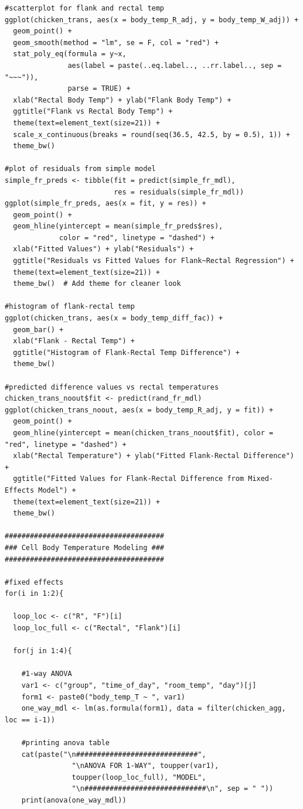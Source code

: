 \documentclass[a4paper, 10pt, titlepage]{article}
\begin{document}
\begin{lstlisting}[basicstyle = \footnotesize \ttfamily]
#scatterplot for flank and rectal temp
ggplot(chicken_trans, aes(x = body_temp_R_adj, y = body_temp_W_adj)) +
  geom_point() +
  geom_smooth(method = "lm", se = F, col = "red") +
  stat_poly_eq(formula = y~x, 
               aes(label = paste(..eq.label.., ..rr.label.., sep = "~~~")), 
               parse = TRUE) +
  xlab("Rectal Body Temp") + ylab("Flank Body Temp") +
  ggtitle("Flank vs Rectal Body Temp") +
  theme(text=element_text(size=21)) +
  scale_x_continuous(breaks = round(seq(36.5, 42.5, by = 0.5), 1)) +
  theme_bw()

#plot of residuals from simple model
simple_fr_preds <- tibble(fit = predict(simple_fr_mdl),
                          res = residuals(simple_fr_mdl))
ggplot(simple_fr_preds, aes(x = fit, y = res)) +
  geom_point() +
  geom_hline(yintercept = mean(simple_fr_preds$res),
             color = "red", linetype = "dashed") +
  xlab("Fitted Values") + ylab("Residuals") +
  ggtitle("Residuals vs Fitted Values for Flank~Rectal Regression") +
  theme(text=element_text(size=21)) +
  theme_bw()  # Add theme for cleaner look

#histogram of flank-rectal temp
ggplot(chicken_trans, aes(x = body_temp_diff_fac)) +
  geom_bar() +
  xlab("Flank - Rectal Temp") +
  ggtitle("Histogram of Flank-Rectal Temp Difference") +
  theme_bw()

#predicted difference values vs rectal temperatures
chicken_trans_noout$fit <- predict(rand_fr_mdl)
ggplot(chicken_trans_noout, aes(x = body_temp_R_adj, y = fit)) +
  geom_point() +
  geom_hline(yintercept = mean(chicken_trans_noout$fit), color = "red", linetype = "dashed") +
  xlab("Rectal Temperature") + ylab("Fitted Flank-Rectal Difference") +
  ggtitle("Fitted Values for Flank-Rectal Difference from Mixed-Effects Model") +
  theme(text=element_text(size=21)) +
  theme_bw()

######################################
### Cell Body Temperature Modeling ###
######################################

#fixed effects
for(i in 1:2){
  
  loop_loc <- c("R", "F")[i]
  loop_loc_full <- c("Rectal", "Flank")[i]
  
  for(j in 1:4){
  
    #1-way ANOVA
    var1 <- c("group", "time_of_day", "room_temp", "day")[j]
    form1 <- paste0("body_temp_T ~ ", var1)
    one_way_mdl <- lm(as.formula(form1), data = filter(chicken_agg, loc == i-1))
    
    #printing anova table
    cat(paste("\n#############################", 
                "\nANOVA FOR 1-WAY", toupper(var1), 
                toupper(loop_loc_full), "MODEL", 
                "\n#############################\n", sep = " "))
    print(anova(one_way_mdl))   
    

\end{lstlisting}
\end{document}
